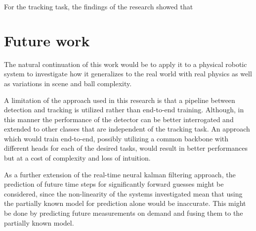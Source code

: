 \documentclass[a4paper,twoside,12pt]{report}
\begin{document}
For the tracking task, the findings of the research showed that

\section{Future work}

The natural continuation of this work would be to apply it to a physical robotic system to investigate how it generalizes to the real world with real physics as well as variations in scene and ball complexity.

A limitation of the approach used in this research is that a pipeline between detection and tracking is utilized rather than end-to-end training. Although, in this manner the performance of the detector can be better interrogated and extended to other classes that are independent of the tracking task. An approach which would train end-to-end, possibly utilizing a common backbone with different heads for each of the desired tasks, would result in better performances but at a cost of complexity and loss of intuition.

As a further extension of the real-time neural kalman filtering approach, the prediction of future time steps for significantly forward guesses might be considered, since the non-linearity of the systems investigated mean that using the partially known model for prediction alone would be inaccurate. This might be done by predicting future measurements on demand and fusing them to the partially known model.

%



\end{document}
